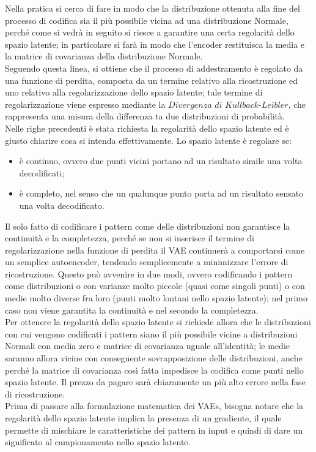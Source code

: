 Nella pratica si cerca di fare in modo che la distribuzione ottenuta alla fine del processo di codifica sia il più possibile vicina ad una distribuzione Normale, perché come si vedrà in seguito si riesce a garantire una certa regolarità dello spazio latente; in particolare si farà in modo che l'encoder restituisca la media e la matrice di covarianza della distribuzione Normale. \\ 
Seguendo questa linea, si ottiene che il processo di addestramento è regolato da una funzione di perdita, composta da un termine relativo alla ricostruzione ed uno relativo alla regolarizzazione dello spazio latente; tale termine di regolarizzazione viene espresso mediante la $\textit{Divergenza di Kullback-Leibler}$, che rappresenta una misura della differenza ta due distribuzioni di probabilità. \\
Nelle righe precedenti è stata richiesta la regolarità dello spazio latente ed è giusto chiarire cosa si intenda effettivamente. Lo spazio latente è regolare se:
\begin{itemize}
	\item è continuo, ovvero due punti vicini portano ad un risultato simile una volta decodificati;
	\item è completo, nel senso che un qualunque punto porta ad un risultato sensato una volta decodificato.  
\end{itemize}
Il solo fatto di codificare i pattern come delle distribuzioni non garantisce la continuità e la completezza, perché se non si inserisce il termine di regolarizzazione nella funzione di perdita il VAE continuerà a comportarsi come un semplice autoencoder, tendendo semplicemente a minimizzare l'errore di ricostruzione. Questo può avvenire in due modi, ovvero codificando i pattern come distribuzioni o con varianze molto piccole (quasi come singoli punti) o con medie molto diverse fra loro (punti molto lontani nello spazio latente); nel primo caso non viene garantita la continuità e nel secondo la completezza. \\ 
Per ottenere la regolarità dello spazio latente si richiede allora che le distribuzioni con cui vengono codificati i pattern siano il più possibile vicine a distribuzioni Normali con media zero e matrice di covarianza uguale all'identità; le medie saranno allora vicine con conseguente sovrapposizione delle distribuzioni, anche perché la matrice di covarianza così fatta impedisce la codifica come punti nello spazio latente. Il prezzo da pagare sarà chiaramente un più alto errore nella fase di ricostruzione.\\ 
Prima di passare alla formulazione matematica dei VAEs, bisogna notare che la regolarità dello spazio latente implica la presenza di un gradiente, il quale permette di mischiare le caratteristiche dei pattern in input e quindi di dare un significato al campionamento nello spazio latente. \\

